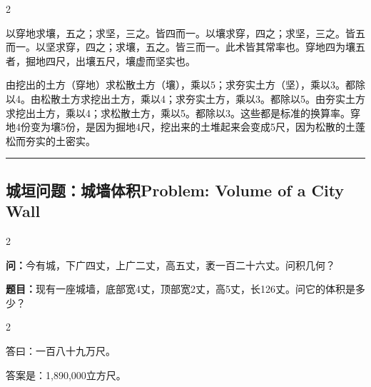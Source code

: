 \documentclass[11pt,a4paper]{article}
\newcommand{\longline}{\noindent\rule{\textwidth}{0.4pt}}
\newcommand{\bilingualsubsection}[2]{%
  \subsection{#1\hfill\normalfont\normalsize\color{sectioncolor}#2}%
}
\begin{document}
\begin{paracol}{2}

\begin{commentarybox}
以穿地求壤，五之；求坚，三之。皆四而一。以壤求穿，四之；求坚，三之。皆五而一。以坚求穿，四之；求壤，五之。皆三而一。此术皆其常率也。穿地四为壤五者，掘地四尺，出壤五尺，壤虚而坚实也。
\end{commentarybox}

\switchcolumn

\begin{commentarybox}
由挖出的土方（穿地）求松散土方（壤），乘以5；求夯实土方（坚），乘以3。都除以4。由松散土方求挖出土方，乘以4；求夯实土方，乘以3。都除以5。由夯实土方求挖出土方，乘以4；求松散土方，乘以5。都除以3。这些都是标准的换算率。穿地4份变为壤5份，是因为掘地4尺，挖出来的土堆起来会变成5尺，因为松散的土蓬松而夯实的土密实。
\end{commentarybox}

\end{paracol}

\vspace{0.5cm}
\longline
\vspace{0.3cm}

\bilingualsubsection{城垣问题：城墙体积}{Problem: Volume of a City Wall}

\begin{paracol}{2}

\begin{problembox}[\CJKfamily{rm}城垣 · 原文]
\textbf{问：}今有城，下广四丈，上广二丈，高五丈，袤一百二十六丈。问积几何？
\end{problembox}

\switchcolumn

\begin{problembox}
\textbf{题目：}现有一座城墙，底部宽4丈，顶部宽2丈，高5丈，长126丈。问它的体积是多少？
\end{problembox}

\end{paracol}

\vspace{0.2cm}

\begin{paracol}{2}

\begin{answerbox}[\CJKfamily{rm}答 · 原文]
答曰：一百八十九万尺。
\end{answerbox}

\switchcolumn

\begin{answerbox}[白话文：答案]
答案是：1,890,000立方尺。
\end{answerbox}

\end{paracol}
\end{document}
